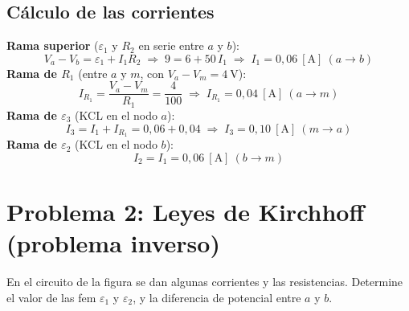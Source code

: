 \documentclass[12pt,letterpaper]{article}
\begin{document}
\subsection*{C\'alculo de las corrientes}
\textbf{Rama superior} ($\varepsilon_1$ y $R_2$ en serie entre $a$ y $b$):
\[
    V_a - V_b = \varepsilon_1 + I_1 R_2 \;\Rightarrow\; 9 = 6 + 50\,I_1
    \;\Rightarrow\; \boxed{I_1 = 0{,}06\ [\text{A}]\ (a\to b)}
\]
\textbf{Rama de $R_1$} (entre $a$ y $m$, con $V_a-V_m = 4\ \text{V}$):
\[
    I_{R_1} = \frac{V_a - V_m}{R_1} = \frac{4}{100}
    \;\Rightarrow\; \boxed{I_{R_1} = 0{,}04\ [\text{A}]\ (a\to m)}
\]
\textbf{Rama de $\varepsilon_3$} (KCL en el nodo $a$):
\[
    I_3 = I_1 + I_{R_1} = 0{,}06 + 0{,}04
    \;\Rightarrow\; \boxed{I_3 = 0{,}10\ [\text{A}]\ (m\to a)}
\]
\textbf{Rama de $\varepsilon_2$} (KCL en el nodo $b$):
\[
    I_2 = I_1 = \boxed{0{,}06\ [\text{A}]\ (b\to m)}
\]

\newpage

\section*{Problema 2: Leyes de Kirchhoff (problema inverso)}

\noindent En el circuito de la figura se dan algunas corrientes y las resistencias. Determine el
valor de las fem $\varepsilon_1$ y $\varepsilon_2$, y la diferencia de potencial entre $a$ y $b$.
\end{document}
